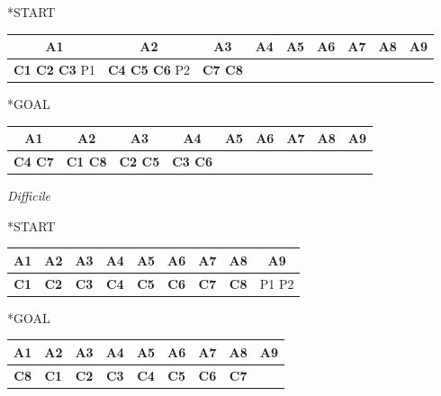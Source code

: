 \documentclass[a4paper,oneside,12pt]{book}
\begin{document}
    \begin{center}
        *{START}
        \begin{tabular}{|c | c| c | c | c | c | c | c |c |}
            \hline
            A1&A2&A3&A4&A5&A6&A7&A8&A9\\
            \hline
            \textbf{C1 C2 C3} P1 &\textbf{C4 C5 C6} P2&\textbf{C7 C8}&&&&&&\\
            \hline
        \end{tabular}

    \end{center}
    \begin{center}
        *{GOAL}
        \begin{tabular}{|c | c| c | c | c | c | c | c |c |}
            \hline
            A1&A2&A3&A4&A5&A6&A7&A8&A9\\
            \hline
            \textbf{C4 C7}&\textbf{C1 C8}&\textbf{C2 C5}&\textbf{C3 C6}&&&&&\\
            \hline
        \end{tabular}

    \end{center}

    \noindent \textit{Difficile}

    \begin{center}
        *{START}
        \begin{tabular}{|c | c| c | c | c | c | c | c |c |}
            \hline
            A1&A2&A3&A4&A5&A6&A7&A8&A9\\
            \hline
            \textbf{C1}  &\textbf{C2} &\textbf{C3}&\textbf{C4}&\textbf{C5}
            &\textbf{C6}&\textbf{C7}&\textbf{C8}&P1 P2\\
            \hline
        \end{tabular}

    \end{center}
    \begin{center}
        *{GOAL}
        \begin{tabular}{|c | c| c | c | c | c | c | c |c |}
            \hline
            A1&A2&A3&A4&A5&A6&A7&A8&A9\\
            \hline
            \textbf{C8}  &\textbf{C1} &\textbf{C2}&\textbf{C3}&\textbf{C4}
            &\textbf{C5}&\textbf{C6}&\textbf{C7}&\\
            \hline
        \end{tabular}

    \end{center}
\end{document}
